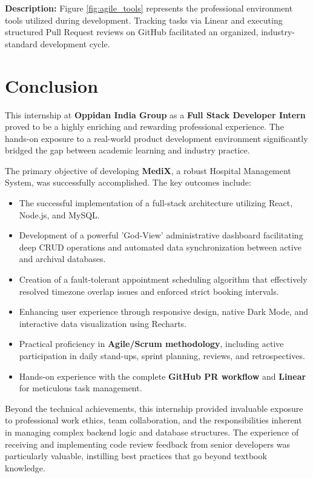 \documentclass[12pt,a4paper]{article}
\begin{document}
\noindent\textbf{Description:} Figure \ref{fig:agile_tools} represents the professional environment tools utilized during development. Tracking tasks via Linear and executing structured Pull Request reviews on GitHub facilitated an organized, industry-standard development cycle.

\newpage
\section{Conclusion}
\label{chap:conclusion}

This internship at \textbf{Oppidan India Group} as a \textbf{Full Stack Developer Intern} proved to be a highly enriching and rewarding professional experience. The hands-on exposure to a real-world product development environment significantly bridged the gap between academic learning and industry practice.

The primary objective of developing \textbf{MediX}, a robust Hospital Management System, was successfully accomplished. The key outcomes include:

\begin{itemize}
    \item The successful implementation of a full-stack architecture utilizing React, Node.js, and MySQL.
    \item Development of a powerful 'God-View' administrative dashboard facilitating deep CRUD operations and automated data synchronization between active and archival databases.
    \item Creation of a fault-tolerant appointment scheduling algorithm that effectively resolved timezone overlap issues and enforced strict booking intervals.
    \item Enhancing user experience through responsive design, native Dark Mode, and interactive data visualization using Recharts.
    \item Practical proficiency in \textbf{Agile/Scrum methodology}, including active participation in daily stand-ups, sprint planning, reviews, and retrospectives.
    \item Hands-on experience with the complete \textbf{GitHub PR workflow} and \textbf{Linear} for meticulous task management.
\end{itemize}

Beyond the technical achievements, this internship provided invaluable exposure to professional work ethics, team collaboration, and the responsibilities inherent in managing complex backend logic and database structures. The experience of receiving and implementing code review feedback from senior developers was particularly valuable, instilling best practices that go beyond textbook knowledge.
\end{document}
